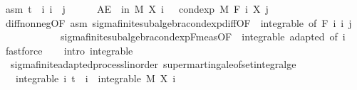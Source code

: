 \begin{isabellebody}
\ asm{\isacharcolon}{\kern0pt}\ {\isachardoublequoteopen}t\ {\isasymle}\ i{\isachardoublequoteclose}\ {\isachardoublequoteopen}i\ {\isasymle}\ j{\isachardoublequoteclose}\isanewline
\ \ \ \ \isamarkupfalse%
\ {\isachardoublequoteopen}AE\ {\isasymxi}\ in\ M{\isachardot}{\kern0pt}\ X\ i\ {\isasymxi}\ {\isasymge}\ cond{\isacharunderscore}{\kern0pt}exp\ M\ {\isacharparenleft}{\kern0pt}F\ i{\isacharparenright}{\kern0pt}\ {\isacharparenleft}{\kern0pt}X\ j{\isacharparenright}{\kern0pt}\ {\isasymxi}{\isachardoublequoteclose}\ \isanewline
\ \ \ \ \ \ \isamarkupfalse%
\ diff{\isacharunderscore}{\kern0pt}nonneg{\isacharbrackleft}{\kern0pt}OF\ asm{\isacharbrackright}{\kern0pt}\ sigma{\isacharunderscore}{\kern0pt}finite{\isacharunderscore}{\kern0pt}subalgebra{\isachardot}{\kern0pt}cond{\isacharunderscore}{\kern0pt}exp{\isacharunderscore}{\kern0pt}diff{\isacharbrackleft}{\kern0pt}OF\ {\isacharunderscore}{\kern0pt}\ integrable{\isacharparenleft}{\kern0pt}{}{\isacharcomma}{\kern0pt}{}{\isacharparenright}{\kern0pt}{\isacharcomma}{\kern0pt}\ of\ {\isachardoublequoteopen}F\ i{\isachardoublequoteclose}\ i\ j{\isacharbrackright}{\kern0pt}\ \isanewline
\ \ \ \ \ \ \ \ \ \ \ \ sigma{\isacharunderscore}{\kern0pt}finite{\isacharunderscore}{\kern0pt}subalgebra{\isachardot}{\kern0pt}cond{\isacharunderscore}{\kern0pt}exp{\isacharunderscore}{\kern0pt}F{\isacharunderscore}{\kern0pt}meas{\isacharbrackleft}{\kern0pt}OF\ {\isacharunderscore}{\kern0pt}\ integrable\ adapted{\isacharcomma}{\kern0pt}\ of\ i{\isacharbrackright}{\kern0pt}\ \isamarkupfalse%
\ fastforce\isanewline
\ \ \isacommand{{\isacharbraceright}{\kern0pt}}\isamarkupfalse%
\isanewline
{}\isamarkupfalse%
\ {\isacharparenleft}{\kern0pt}intro\ integrable{\isacharparenright}{\kern0pt}%
\endisatagproof
{\isafoldproof}%
%
\isadelimproof
\isanewline
%
\endisadelimproof
\isanewline
{}\isamarkupfalse%
\ {\isacharparenleft}{\kern0pt}\ sigma{\isacharunderscore}{\kern0pt}finite{\isacharunderscore}{\kern0pt}adapted{\isacharunderscore}{\kern0pt}process{\isacharunderscore}{\kern0pt}linorder{\isacharparenright}{\kern0pt}\ supermartingale{\isacharunderscore}{\kern0pt}of{\isacharunderscore}{\kern0pt}set{\isacharunderscore}{\kern0pt}integral{\isacharunderscore}{\kern0pt}ge{\isacharcolon}{\kern0pt}\isanewline
\ \ \ integrable{\isacharcolon}{\kern0pt}\ {\isachardoublequoteopen}{\isasymAnd}i{\isachardot}{\kern0pt}\ t\ {\isasymle}\ i\ {\isasymLongrightarrow}\ integrable\ M\ {\isacharparenleft}{\kern0pt}X\ i{\isacharparenright}{\kern0pt}{\isachardoublequoteclose}\ \isanewline

\end{isabellebody}
